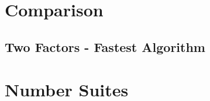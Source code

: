 





\chapter{Comparison}
\section{Two Factors - Fastest Algorithm}


\chapter{Number Suites}
\label{numbersuites}
